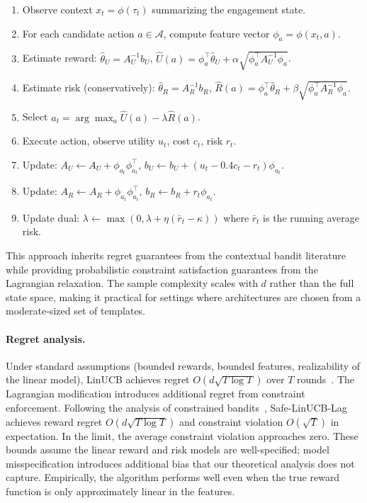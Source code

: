 \documentclass[sigconf,anonymous]{acmart}
\begin{document}
\begin{enumerate}
\item Observe context $x_t = \phi(\tau_t)$ summarizing the engagement state.
\item For each candidate action $a \in \mathcal{A}$, compute feature vector $\phi_a = \phi(x_t, a)$.
\item Estimate reward: $\hat{\theta}_U = A_U^{-1} b_U$, $\hat{U}(a) = \phi_a^\top \hat{\theta}_U + \alpha \sqrt{\phi_a^\top A_U^{-1} \phi_a}$.
\item Estimate risk (conservatively): $\hat{\theta}_R = A_R^{-1} b_R$, $\hat{R}(a) = \phi_a^\top \hat{\theta}_R + \beta \sqrt{\phi_a^\top A_R^{-1} \phi_a}$.
\item Select $a_t = \arg\max_a \hat{U}(a) - \lambda \hat{R}(a)$.
\item Execute action, observe utility $u_t$, cost $c_t$, risk $r_t$.
\item Update: $A_U \gets A_U + \phi_{a_t} \phi_{a_t}^\top$, $b_U \gets b_U + (u_t - 0.4 c_t - r_t) \phi_{a_t}$.
\item Update: $A_R \gets A_R + \phi_{a_t} \phi_{a_t}^\top$, $b_R \gets b_R + r_t \phi_{a_t}$.
\item Update dual: $\lambda \gets \max(0, \lambda + \eta(\bar{r}_t - \kappa))$ where $\bar{r}_t$ is the running average risk.
\end{enumerate}

This approach inherits regret guarantees from the contextual bandit literature~\cite{chu2011contextual} while providing probabilistic constraint satisfaction guarantees from the Lagrangian relaxation. The sample complexity scales with $d$ rather than the full state space, making it practical for settings where architectures are chosen from a moderate-sized set of templates.

\paragraph{Regret analysis.} Under standard assumptions (bounded rewards, bounded features, realizability of the linear model), LinUCB achieves regret $O(d\sqrt{T \log T})$ over $T$ rounds~\cite{chu2011contextual}. The Lagrangian modification introduces additional regret from constraint enforcement. Following the analysis of constrained bandits~\cite{amani2019linear}, Safe-LinUCB-Lag achieves reward regret $O(d\sqrt{T \log T})$ and constraint violation $O(\sqrt{T})$ in expectation. In the limit, the average constraint violation approaches zero. These bounds assume the linear reward and risk models are well-specified; model misspecification introduces additional bias that our theoretical analysis does not capture. Empirically, the algorithm performs well even when the true reward function is only approximately linear in the features.
\end{document}
